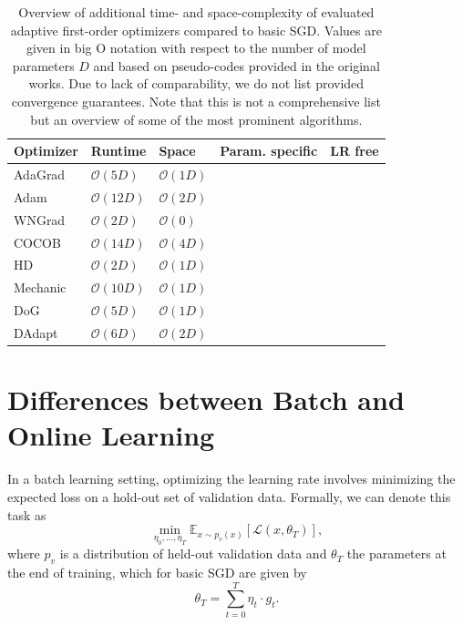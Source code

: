 \documentclass[letterpaper]{article} %
\newcommand{\cmark}{\ding{51}} %
\newcommand{\xmark}{\ding{55}} %
\begin{document}
\begin{table}[ht]
	\centering
	\small
	\begin{tabular}{@{}lllcc@{}}
		\toprule
		Optimizer               & Runtime            & Space             & Param. specific & LR free \\ \midrule
		AdaGrad                 & $\mathcal{O}(5D)$  & $\mathcal{O}(1D)$ & \cmark          & \xmark  \\
		Adam                    & $\mathcal{O}(12D)$ & $\mathcal{O}(2D)$ & \cmark          & \xmark  \\
		WNGrad                  & $\mathcal{O}(2D)$  & $\mathcal{O}(0)$  & \xmark          & \xmark  \\
		COCOB                   & $\mathcal{O}(14D)$ & $\mathcal{O}(4D)$ & \cmark          & \cmark  \\
		HD \footnotemark[1]     & $\mathcal{O}(2D)$  & $\mathcal{O}(1D)$ & \xmark          & \xmark  \\
		Mechanic                & $\mathcal{O}(10D)$ & $\mathcal{O}(1D)$ & \cmark          & \cmark  \\
		DoG \footnotemark[1]    & $\mathcal{O}(5D)$  & $\mathcal{O}(1D)$ & \xmark          & \cmark  \\
		DAdapt \footnotemark[1] & $\mathcal{O}(6D)$  & $\mathcal{O}(2D)$ & \xmark          & \cmark  \\
		\bottomrule
	\end{tabular}
	\caption{Overview of additional time- and space-complexity of evaluated adaptive first-order optimizers compared to basic SGD. Values are given in big O notation with respect to the number of model parameters $D$ and based on pseudo-codes provided in the original works. Due to lack of comparability, we do not list provided convergence guarantees. Note that this is not a comprehensive list but an overview of some of the most prominent algorithms.}\label{tab:param_free_optims}
\end{table}

\section{Differences between Batch and Online Learning}\label{sec:diffs_batch_online}

In a batch learning setting, optimizing the learning rate involves minimizing the expected loss on a hold-out set of validation data.
Formally, we can denote this task as
\begin{equation}
	\label{eq:batch_lr_optim}
	\min_{\eta_0, \ldots, \eta_T} \mathbb{E}_{x \sim p_v(x)}[\mathcal{L}(x, \theta_T)],
\end{equation}
where $p_v$ is a distribution of held-out validation data and $\theta_T$ the parameters at the end of training, which for basic SGD are given by
\begin{equation}
	\theta_T = \sum_{t=0}^{T} \eta_t \cdot g_t.
\end{equation}
\end{document}
